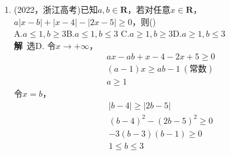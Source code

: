 \begin{enumerate}[label={【\textbf{例\thechapter.\arabic*}】},
 leftmargin=\inteval{\myenumleftmargin}pt,
 itemsep=\inteval{\myenumitempsep}pt,
 itemindent=\inteval{\myenumitemindent}pt]
为什么$  f(1)+f(3)-2f(2) $恰好等于2呢？实际上是用待定系数法确定的系数，
\begin{align*}
 \lambda_1 f(1)+\lambda_2 f(2)+\lambda_3 f(3)=&\ \lambda_1 (1+b+c)+
 \lambda_2 (4+2b+c)+\lambda_3 (9+3b+c)  \\
 =&\ (\lambda_1+4\lambda_2+9\lambda_3)+
 (\lambda_1+2 \lambda_2+ 3\lambda_3)b+(\lambda_1+\lambda_2+\lambda_3)c
\end{align*}
为使该式不包含$ b,c $，
那么$ \begin{cases}
 \lambda_1+2 \lambda_2+ 3\lambda_3=0 \\
 \lambda_1+\lambda_2+\lambda_3=0
\end{cases} $，
解得$ \lambda_2=-2 \lambda_1,\ \lambda_3=\lambda_1 $. 
于是$ \lambda_1+4\lambda_2+9\lambda_3=2\lambda_1.\ \lambda_1$可取任意非零值。

\item (2022，浙江高考)已知$a,b\in\mathbf{R}$，若对任意$x\in\mathbf{R} $， 
$ a|x-b|+|x-4|-|2x-5|\geq 0$，则(\q ) \\
A.$a\leq 1,b\geq 3$\qquad   B.$a\leq 1,b\leq 3$ \qquad
C.$a\geq 1,b\geq 3$\qquad   D.$a\geq 1,b\leq 3$ \\
\textbf{解}\ 选D. 令$x\to+\infty $，
\begin{gather*}
    ax-ab+x-4-2x+5\geq 0 \\
    (a-1)x\geq ab-1\ (\text{常数}) \\
    a\geq 1
\end{gather*}
令$ x=b $，
\begin{gather*}
    |b-4| \geq |2b-5| \\
    (b-4)^{2}-(2b-5)^{2}\geq 0 \\
    -3(b-3)(b-1)\geq 0 \\
    1 \leq b\leq 3
\end{gather*}


\end{enumerate}
